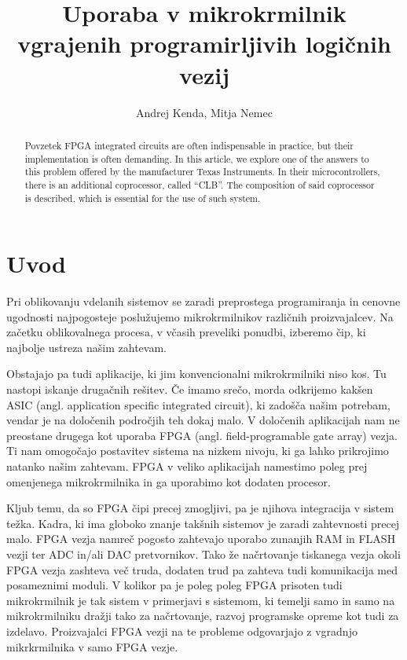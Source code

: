 \documentclass[a4paper]{article}
\begin{document}
\begin{sloppypar}
\title{Uporaba v mikrokrmilnik vgrajenih programirljivih logičnih vezij}

\author{Andrej Kenda, Mitja Nemec}



\maketitle



\begin{abstract}{Povzetek}
FPGA integrated circuits are often indispensable in practice, but their implementation is often demanding. In this article, we explore one of the answers to this problem offered by the manufacturer Texas Instruments. In their microcontrollers, there is an additional coprocessor, called ``CLB''. The composition of said coprocessor is described, which is essential for the use of such system.
\end{abstract}




\section{Uvod}
Pri oblikovanju vdelanih sistemov se zaradi preprostega programiranja in
cenovne ugodnosti najpogosteje poslužujemo mikrokrmilnikov različnih
proizvajalcev. Na začetku oblikovalnega procesa, v
včasih preveliki ponudbi, izberemo čip, ki najbolje ustreza našim zahtevam.

Obstajajo pa tudi aplikacije, ki jim konvencionalni mikrokrmilniki niso kos. Tu
nastopi iskanje drugačnih rešitev. Če imamo srečo, morda odkrijemo kakšen ASIC
(angl. application specific integrated circuit), ki zadošča našim potrebam,
vendar je na določenih področjih teh dokaj malo. V določenih aplikacijah nam ne
preostane drugega kot uporaba FPGA (angl. field-programable
gate array) vezja. Ti nam omogočajo postavitev sistema na nizkem nivoju, ki ga lahko
prikrojimo natanko našim zahtevam. FPGA v veliko aplikacijah namestimo poleg
prej omenjenega mikrokrmilnika in ga uporabimo kot dodaten procesor.

Kljub temu, da so FPGA čipi precej zmogljivi, pa je njihova integracija v sistem težka.
Kadra, ki ima globoko znanje takšnih sistemov je zaradi zahtevnosti
precej malo. FPGA vezja namreč pogosto zahtevajo uporabo zunanjih RAM in FLASH vezji ter ADC in/ali DAC pretvornikov. Tako že načrtovanje tiskanega vezja okoli FPGA vezja zashteva več truda, dodaten trud pa zahteva tudi 
komunikacija med posameznimi moduli. V kolikor pa je poleg poleg FPGA prisoten tudi mikrokrmilnik je tak sistem v primerjavi s sistemom, ki temelji samo in samo na mikrokrmilniku dražji tako za načrtovanje, razvoj programske opreme kot tudi za izdelavo. Proizvajalci FPGA vezji na te probleme odgovarjajo z vgradnjo mikrkrmilnika v samo FPGA vezje.


\end{sloppypar}
\end{document}

